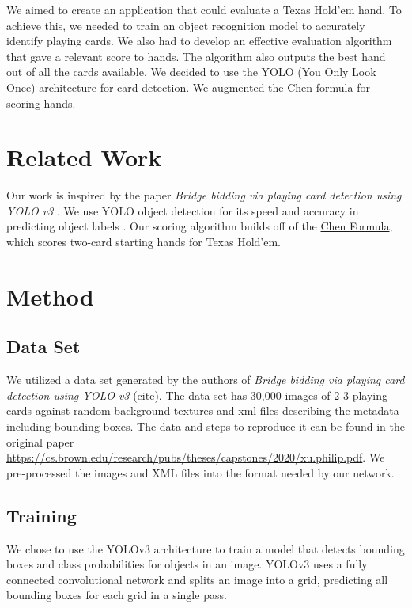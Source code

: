 \documentclass[10pt,twocolumn,letterpaper]{article}
\begin{document}
We aimed to create an application that could evaluate a Texas Hold'em hand. To achieve this, we needed to train an object recognition model to accurately identify playing cards. We also had to develop an effective evaluation algorithm that gave a relevant score to hands. The algorithm also outputs the best hand out of all the cards available. We decided to use the YOLO (You Only Look Once) architecture for card detection. We augmented the Chen formula for scoring hands.

\section{Related Work}

Our work is inspired by the paper\textit{ Bridge bidding via playing card detection using YOLO v3} \cite{bridge}. We use YOLO object detection for its speed and accuracy in predicting object labels \cite{yolo}. Our scoring algorithm builds off of the \hyperlink{https://www.thepokerbank.com/strategy/basic/starting-hand-selection/chen-formula/}{ Chen Formula}, which scores two-card starting hands for Texas Hold'em. 

\section{Method}
\subsection{Data Set}

We utilized a data set generated by the authors of \textit{Bridge bidding via playing card detection using YOLO v3} (cite). The data set has 30,000 images of 2-3 playing cards against random background textures and xml files describing the metadata including bounding boxes. The data and steps to reproduce it can be found in the original paper \url{https://cs.brown.edu/research/pubs/theses/capstones/2020/xu.philip.pdf}. We pre-processed the images and XML files into the format needed by our network.

\subsection{Training}
We chose to use the YOLOv3 architecture to train a model that detects bounding boxes and class probabilities for objects in an image. YOLOv3 uses a fully connected convolutional network and splits an image into a grid, predicting all bounding boxes for each grid in a single pass. 
\end{document}
